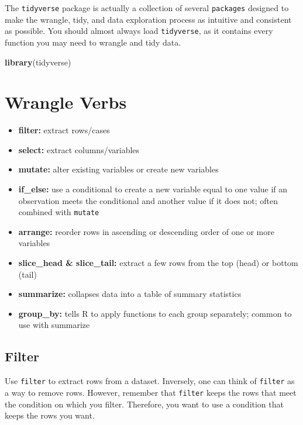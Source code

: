 \documentclass[
]{book}
\makeatletter
\newenvironment{Shaded}{\begin{snugshade}}{\end{snugshade}}
\newcommand{\FunctionTok}[1]{\textcolor[rgb]{0.27,0.27,0.27}{\textbf{#1}}}
\newcommand{\NormalTok}[1]{#1}
\providecommand{\tightlist}{%
  \setlength{\itemsep}{0pt}\setlength{\parskip}{0pt}}
\newenvironment{kframe}{%
\medskip{}
\setlength{\fboxsep}{.8em}
 \def\at@end@of@kframe{}%
 \ifinner\ifhmode%
  \def\at@end@of@kframe{\end{minipage}}%
  \begin{minipage}{\columnwidth}%
 \fi\fi%
 \def\FrameCommand##1{\hskip\@totalleftmargin \hskip-\fboxsep
 \colorbox{shadecolor}{##1}\hskip-\fboxsep
     \hskip-\linewidth \hskip-\@totalleftmargin \hskip\columnwidth}%
 \MakeFramed {\advance\hsize-\width
   \@totalleftmargin\z@ \linewidth\hsize
   \@setminipage}}%
 {\par\unskip\endMakeFramed%
 \at@end@of@kframe}
\renewenvironment{Shaded}{\begin{kframe}}{\end{kframe}}
\makeatother
\begin{document}
The \texttt{tidyverse} package is actually a collection of several \texttt{packages} designed to make the wrangle, tidy, and data exploration process as intuitive and consistent as possible. You should almost always load \texttt{tidyverse}, as it contains every function you may need to wrangle and tidy data.

\begin{Shaded}
\begin{Highlighting}[]
\FunctionTok{library}\NormalTok{(tidyverse)}
\end{Highlighting}
\end{Shaded}

\hypertarget{wrangle-verbs}{%
\section{Wrangle Verbs}\label{wrangle-verbs}}

\begin{itemize}
\tightlist
\item
  \textbf{filter:} extract rows/cases
\item
  \textbf{select:} extract columns/variables
\item
  \textbf{mutate:} alter existing variables or create new variables
\item
  \textbf{if\_else:} use a conditional to create a new variable equal to one value if an observation meets the conditional and another value if it does not; often combined with \texttt{mutate}
\item
  \textbf{arrange:} reorder rows in ascending or descending order of one or more variables
\item
  \textbf{slice\_head \& slice\_tail:} extract a few rows from the top (head) or bottom (tail)
\item
  \textbf{summarize:} collapses data into a table of summary statistics
\item
  \textbf{group\_by:} tells R to apply functions to each group separately; common to use with summarize
\end{itemize}

\hypertarget{filter}{%
\subsection{Filter}\label{filter}}

Use \texttt{filter} to extract rows from a dataset. Inversely, one can think of \texttt{filter} as a way to remove rows. However, remember that \texttt{filter} keeps the rows that meet the condition on which you filter. Therefore, you want to use a condition that keeps the rows you want.
\end{document}
